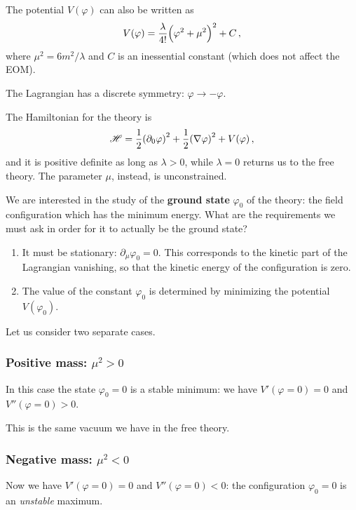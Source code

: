 \documentclass[main.tex]{subfiles}
\begin{document}
The potential \(V(\varphi )\) can also be written as 
%
\begin{align}
V(\varphi ) = \frac{\lambda}{4!} \qty(\varphi^2 + \mu^2)^2 + C
\,,
\end{align}
%
where \(\mu^2 = 6 m^2 / \lambda \) and \(C\) is an inessential constant (which does not affect the EOM). 

The Lagrangian has a discrete symmetry: \(\varphi \to -\varphi \). 

The Hamiltonian for the theory is 
%
\begin{align}
\mathscr{H} = \frac{1}{2} \qty(\partial_0 \varphi )^2 + \frac{1}{2} \qty(\nabla \varphi )^2 + V(\varphi )
\,,
\end{align}
%
and it is positive definite as long as \(\lambda > 0\), while \(\lambda = 0\) returns us to the free theory. The parameter \(\mu \), instead, is unconstrained.

We are interested in the study of the \textbf{ground state} \(\varphi_0 \) of the theory: the field configuration which has the minimum energy. 
What are the requirements we must ask in order for it to actually be the ground state? 

\begin{enumerate}
    \item It must be stationary: \(\partial_{\mu } \varphi_0 = 0\). This corresponds to the kinetic part of the Lagrangian vanishing, so that the kinetic energy of the configuration is zero. 
    \item The value of the constant \(\varphi_0 \) is determined by minimizing the potential \(V (\varphi_0 )\). 
\end{enumerate}


Let us consider two separate cases. 

\subsubsection{Positive mass: \(\mu^2> 0\)} 

In this case the state \(\varphi_0  = 0\) is a stable minimum: we have \(V' (\varphi  = 0) = 0\) and \(V'' (\varphi = 0) > 0\). 

This is the same vacuum we have in the free theory. 

\subsubsection{Negative mass: \(\mu^2 <0\)}

Now we have \(V'(\varphi =0) = 0\) and \(V'' (\varphi=0) < 0\): the configuration \(\varphi_0 = 0\) is an \emph{unstable} maximum. 
\end{document}
